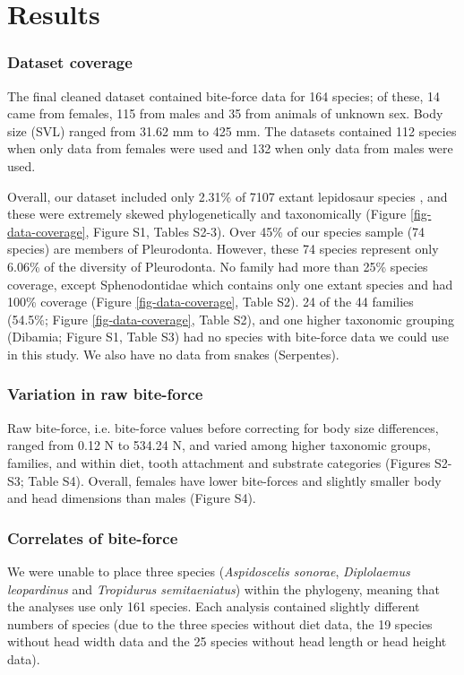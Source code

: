\documentclass[a4paper, 12pt]{article}
\begin{document}

\section{Results}

\subsubsection{Dataset coverage}
The final cleaned dataset contained bite-force data for 164 species; of these, 14 came from females, 115 from males and 35 from animals of unknown sex. 
Body size (SVL) ranged from 31.62 mm to 425 mm. 
The datasets contained 112 species when only data from females were used and 132 when only data from males were used. 

Overall, our dataset included only 2.31\% of 7107 extant lepidosaur species \citep{uetz2020reptile}, and these were extremely skewed phylogenetically and taxonomically (Figure \ref{fig-data-coverage}, Figure S1, Tables S2-3). 
Over 45\% of our species sample (74 species) are members of Pleurodonta. 
However, these 74 species represent only 6.06\% of the diversity of Pleurodonta. 
No family had more than 25\% species coverage, except Sphenodontidae which contains only one extant species and had 100\% coverage (Figure \ref{fig-data-coverage}, Table S2). 
24 of the 44 families (54.5\%; Figure \ref{fig-data-coverage}, Table S2), and one higher taxonomic grouping (Dibamia; Figure S1, Table S3) had no species with bite-force data we could use in this study. 
We also have no data from snakes (Serpentes).

\subsubsection{Variation in raw bite-force}
Raw bite-force, i.e. bite-force values before correcting for body size differences, ranged from 0.12 N to 534.24 N, and varied among higher taxonomic groups, families, and within diet, tooth attachment and substrate categories (Figures S2-S3; Table S4). 
Overall, females have lower bite-forces and slightly smaller body and head dimensions than males (Figure S4).

\subsubsection{Correlates of bite-force}
We were unable to place three species (\textit{Aspidoscelis sonorae}, \textit{Diplolaemus leopardinus} and \textit{Tropidurus semitaeniatus}) within the phylogeny, meaning that the analyses use only 161 species. 
Each analysis contained slightly different numbers of species (due to the three species without diet data, the 19 species without head width data and the 25 species without head length or head height data).
\end{document}
